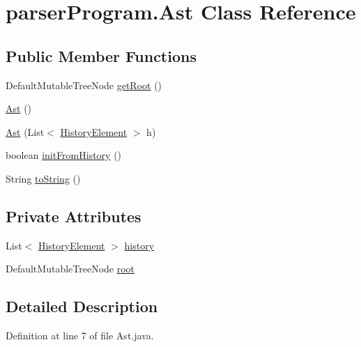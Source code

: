\hypertarget{classparser_program_1_1_ast}{\section{parser\-Program.\-Ast Class Reference}
\label{classparser_program_1_1_ast}
}
\subsection*{Public Member Functions}
\begin{DoxyCompactItemize}
\item 
Default\-Mutable\-Tree\-Node \hyperlink{classparser_program_1_1_ast_af586bb4da64c79d9259c87757456d685}{get\-Root} ()
\item 
\hyperlink{classparser_program_1_1_ast_ae717a4491faf02f3753ad055eec6d5dd}{Ast} ()
\item 
\hyperlink{classparser_program_1_1_ast_a0dd9cc520a52069ec8d2bcccf7567799}{Ast} (List$<$ \hyperlink{classparser_program_1_1_history_element}{History\-Element} $>$ h)
\item 
boolean \hyperlink{classparser_program_1_1_ast_ad959cf65d00f25b4645d9ade0fb60410}{init\-From\-History} ()
\item 
String \hyperlink{classparser_program_1_1_ast_a58d8cf855d692e96d5af5d49a8bca4b9}{to\-String} ()
\end{DoxyCompactItemize}
\subsection*{Private Attributes}
\begin{DoxyCompactItemize}
\item 
List$<$ \hyperlink{classparser_program_1_1_history_element}{History\-Element} $>$ \hyperlink{classparser_program_1_1_ast_a565a13f94f478e998401f7abc25643aa}{history}
\item 
Default\-Mutable\-Tree\-Node \hyperlink{classparser_program_1_1_ast_a004223ce41eed0c97a6fb63449b4b836}{root}
\end{DoxyCompactItemize}


\subsection{Detailed Description}


Definition at line 7 of file Ast.\-java.



